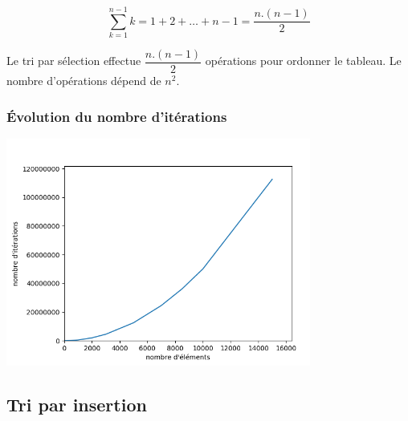 \documentclass[svgnames,11pt]{beamer}
\begin{document}
\begin{frame}
    \frametitle{}
    $$\sum_{k=1}^{n-1}{k}=1+2+\dots+n-1=\dfrac{n.(n-1)}{2}$$
    \begin{aretenir}[]
        Le tri par sélection effectue $\dfrac{n.(n-1)}{2}$ opérations pour ordonner le tableau. Le nombre d'opérations dépend de $n^2$.
    \end{aretenir}

\end{frame}

\begin{frame}
    \frametitle{Évolution du nombre d'itérations}

    \begin{center}
    \centering
    \includegraphics[width=10cm]{ressources/complexite-selection.png}
    \end{center}
\end{frame}
\subsection{Tri par insertion}
\end{document}
